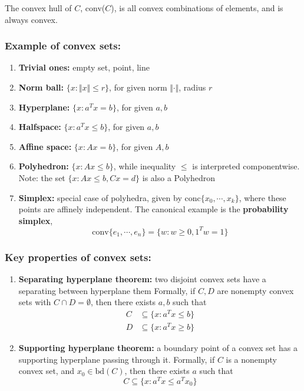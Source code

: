 \documentclass[a4paper]{article}
\begin{document}
{\begin{defi} 
  The convex hull of $ C $, conv($C$), is all convex combinations of elements, and is always convex.
\end{defi}

\subsubsection{Example of convex sets:}
\begin{enumerate}
  \item \textbf{Trivial ones:} empty set, point, line 
  \item \textbf{Norm ball:} $\{x: \Vert x \Vert \leq r \}$, for given norm $\Vert \cdot \Vert$, radius $r$
  \item \textbf{Hyperplane:} $\{x: a^T x = b \}$, for given $a, b$
  \item \textbf{Halfspace:} $\{x: a^T x \leq b \}$, for given $a, b$
  \item \textbf{Affine space:} $\{x: A x = b \}$, for given $A, b$
  \item \textbf{Polyhedron:} $\{x: A x \leq b \}$, while inequality $\leq$ is interpreted componentwise. Note: the set $\{x: A x \leq b, Cx = d \}$ is also a Polyhedron
  \item \textbf{Simplex:} special case of polyhedra, given by conc$\{x_0,\cdots,x_k \}$, where these points are affinely independent. The canonical example is the \textbf{probability simplex},
  \[
    \text{conv}\{ e_1,\cdots,e_n\} = \{w: w \geq 0, 1^T w = 1\}
    \]
\end{enumerate}

\subsubsection{Key properties of convex sets:}
\begin{enumerate}
  \item \textbf{Separating hyperplane theorem:} two disjoint convex sets have a separating between hyperplane them
  Formally, if $C, D$ are nonempty convex sets with $C\cap  D = \emptyset $, then there exists $a, b$ such that
  \begin{align*}
    C & \subseteq \{x : a^T x \leq b\} \\
    D & \subseteq \{x : a^T x \geq b\} 
  \end{align*}
  \item \textbf{Supporting hyperplane theorem:} a boundary point of a convex set has a supporting hyperplane passing through it. Formally, if $C$ is a nonempty convex set, and $x_0 \in \text{bd}(C)$, then there exists $a$ such that 
  \begin{equation}
    C \subseteq \{x : a^T x \leq a^T x_0\} 
  \end{equation}
\end{enumerate}

}
\end{document}
